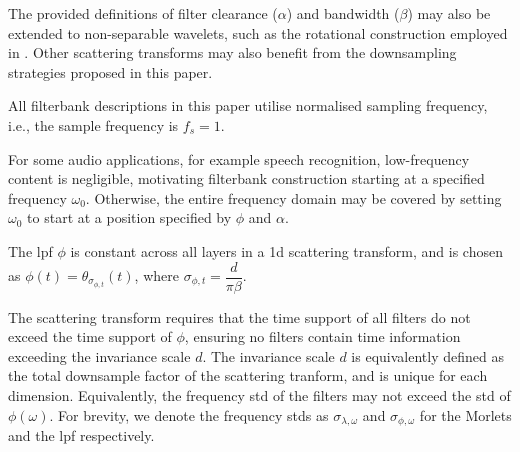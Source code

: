 
The provided definitions of filter clearance ($\alpha$) and bandwidth ($\beta$) may also be extended to non-separable wavelets, such as the rotational construction employed in \cite{2dscattering}. Other scattering transforms may also benefit from the downsampling strategies proposed in this paper.


All filterbank descriptions in this paper utilise normalised sampling frequency, i.e., the sample frequency is $f_s = 1$.

For some audio applications, for example speech recognition, low-frequency content is negligible, motivating filterbank construction starting at a specified frequency $\omega_0$. Otherwise, the entire frequency domain may be covered by setting $\omega_0$ to start at a position specified by $\phi$ and $\alpha$.

The \ac{lpf} $\phi$ is constant across all layers in a \ac{1d} scattering transform, and is chosen as $\phi(t) = \theta_{\sigma_{\phi, t}}(t)$, where $\sigma_{\phi, t} = \dfrac{d}{ \pi \beta}$.

The scattering transform requires that the time support of all filters do not exceed the time support of $\phi$, ensuring no filters contain time information exceeding the invariance scale $d$. The invariance scale $d$ is equivalently defined as the total downsample factor of the scattering tranform, and is unique for each dimension. Equivalently, the frequency \ac{std} of the filters may not exceed the \ac{std} of $\phi(\omega)$. For brevity, we denote the frequency \ac{std}s as $\sigma_{\lambda, \omega}$ and $\sigma_{\phi, \omega}$ for the Morlets and the \ac{lpf} respectively. 

